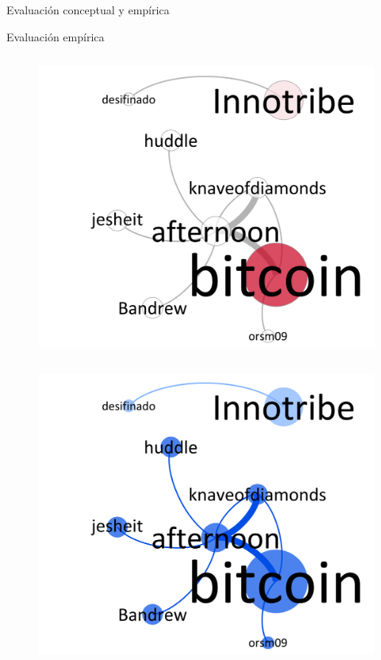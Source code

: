 \begin{frame}{Evaluación conceptual y empírica}
\begin{block}{Evaluación empírica}
\begin{minipage}[t][.40\textheight][t]{\textwidth}
\begin{column}{0.3\textwidth}
    \tiny
    \begin{figure}[H]
        \begin{center}
             \includegraphics[width=1\textwidth]{images/C3/c3_red_influ_real.pdf}
         \end{center}
    \end{figure}
\end{column}
\begin{column}{0.3\textwidth}  
    \tiny
    \begin{figure}[H]
        \begin{center}
         \includegraphics[width=1\textwidth]{images/C3/c3_red_comunidades_real.pdf}

\end{center}
\end{figure}
\end{column}
\end{minipage}
\end{block}
\end{frame}
